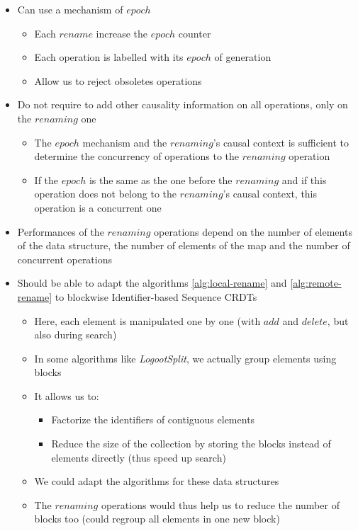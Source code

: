 \documentclass[a4paper]{article}
\begin{document}
\begin{itemize}
  \item Can use a mechanism of $epoch$
  \begin{itemize}
    \item Each $rename$ increase the $epoch$ counter
    \item Each operation is labelled with its $epoch$ of generation
    \item Allow us to reject obsoletes operations
  \end{itemize}
  \item Do not require to add other causality information on all operations, only on the $renaming$ one
  \begin{itemize}
    \item The $epoch$ mechanism and the $renaming$'s causal context is sufficient
      to determine the concurrency of operations to the $renaming$ operation
    \item If the $epoch$ is the same as the one before the $renaming$
      and if this operation does not belong to the $renaming$'s causal context,
      this operation is a concurrent one
  \end{itemize}
  \item Performances of the $renaming$ operations depend on the number of elements
    of the data structure, the number of elements of the map
    and the number of concurrent operations
  \item Should be able to adapt the algorithms \ref{alg:local-rename} and \ref{alg:remote-rename}
    to blockwise Identifier-based Sequence \acp{CRDT}
  \begin{itemize}
    \item Here, each element is manipulated one by one (with $add$ and $delete$, but also during search)
    \item In some algorithms like \emph{LogootSplit},
      we actually group elements using blocks
    \item It allows us to:
    \begin{itemize}
      \item Factorize the identifiers of contiguous elements
      \item Reduce the size of the collection by storing
        the blocks instead of elements directly (thus speed up search)
    \end{itemize}
    \item We could adapt the algorithms for these data structures
    \item The $renaming$ operations would thus help us
      to reduce the number of blocks too (could regroup all elements in one new block)
  \end{itemize}
\end{itemize}
\end{document}
